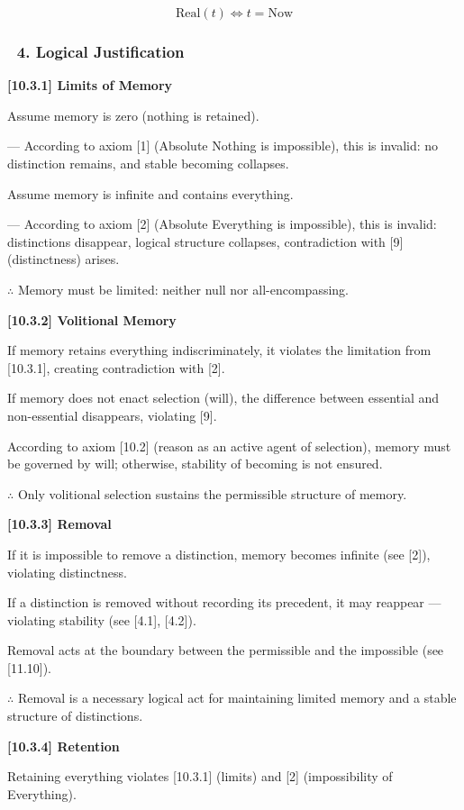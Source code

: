 \documentclass[12pt]{article}
\begin{document}
\[
\text{Real}(t) \Leftrightarrow t = \text{Now}
\]

\subsubsection*{🔹 4. Logical Justification}

\textbf{[10.3.1] Limits of Memory}

Assume memory is zero (nothing is retained).

— According to axiom [1] (Absolute Nothing is impossible), this is invalid: no distinction remains, and stable becoming collapses.

Assume memory is infinite and contains everything.

— According to axiom [2] (Absolute Everything is impossible), this is invalid: distinctions disappear, logical structure collapses, contradiction with [9] (distinctness) arises.

$\therefore$ Memory must be limited: neither null nor all-encompassing.

\bigskip
\textbf{[10.3.2] Volitional Memory}

If memory retains everything indiscriminately, it violates the limitation from [10.3.1], creating contradiction with [2].

If memory does not enact selection (will), the difference between essential and non-essential disappears, violating [9].

According to axiom [10.2] (reason as an active agent of selection), memory must be governed by will; otherwise, stability of becoming is not ensured.

$\therefore$ Only volitional selection sustains the permissible structure of memory.

\bigskip
\textbf{[10.3.3] Removal}

If it is impossible to remove a distinction, memory becomes infinite (see [2]), violating distinctness.

If a distinction is removed without recording its precedent, it may reappear — violating stability (see [4.1], [4.2]).

Removal acts at the boundary between the permissible and the impossible (see [11.10]).

$\therefore$ Removal is a necessary logical act for maintaining limited memory and a stable structure of distinctions.

\bigskip
\textbf{[10.3.4] Retention}

Retaining everything violates [10.3.1] (limits) and [2] (impossibility of Everything).
\end{document}
